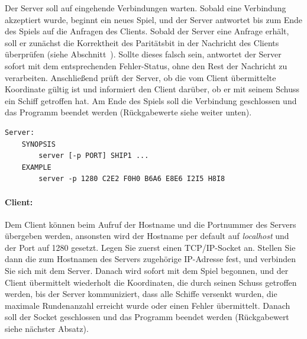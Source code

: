Der Server soll auf eingehende Verbindungen warten. Sobald eine Verbindung
akzeptiert wurde, beginnt ein neues Spiel, und der Server antwortet bis zum
Ende des Spiels auf die Anfragen des Clients.
Sobald der Server eine Anfrage erhält, soll er zunächst die Korrektheit des Paritätsbit in der Nachricht des Clients
überprüfen (siehe Abschnitt~).
Sollte dieses falsch sein, antwortet der Server sofort mit dem entsprechenden Fehler-Status,
ohne den Rest der Nachricht zu verarbeiten.
Anschließend prüft der Server, ob die vom Client übermittelte Koordinate gültig ist
und informiert den Client darüber, ob er mit seinem Schuss ein Schiff getroffen hat.
Am Ende des Spiels soll die Verbindung geschlossen und das Programm beendet werden
(Rückgabewerte siehe weiter unten).



\begin{verbatim}
Server:
    SYNOPSIS
        server [-p PORT] SHIP1 ...
    EXAMPLE
        server -p 1280 C2E2 F0H0 B6A6 E8E6 I2I5 H8I8
\end{verbatim}

\paragraph{Client:}

Dem Client können beim Aufruf der Hostname und die Portnummer des Servers
übergeben werden, ansonsten wird der Hostname per default auf \emph{localhost}
und der Port auf 1280 gesetzt. Legen Sie zuerst einen
TCP/IP-Socket an. Stellen Sie dann die zum Hostnamen des Servers zugehörige
IP-Adresse fest, und verbinden Sie sich mit dem Server. Danach wird sofort mit
dem Spiel begonnen, und der Client übermittelt wiederholt die Koordinaten,
die durch seinen Schuss getroffen werden, bis der Server kommuniziert,
dass alle Schiffe versenkt wurden, die maximale Rundenanzahl erreicht wurde
oder einen Fehler übermittelt.
Danach soll der Socket geschlossen und das
Programm beendet werden (Rückgabewert siehe nächster Absatz).

